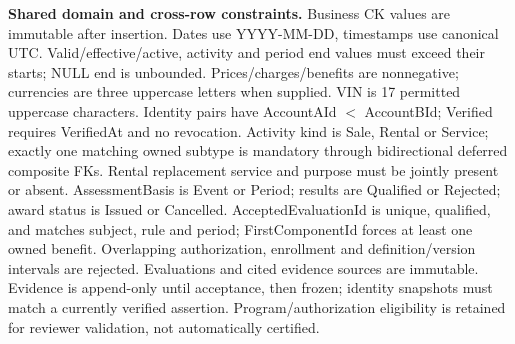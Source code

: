 \par\vspace{4pt}\textbf{Shared domain and cross-row constraints.} Business CK values are immutable after insertion. Dates use YYYY-MM-DD, timestamps use canonical UTC. Valid/effective/active, activity and period end values must exceed their starts; NULL end is unbounded. Prices/charges/benefits are nonnegative; currencies are three uppercase letters when supplied. VIN is 17 permitted uppercase characters. Identity pairs have AccountAId $<$ AccountBId; Verified requires VerifiedAt and no revocation. Activity kind is Sale, Rental or Service; exactly one matching owned subtype is mandatory through bidirectional deferred composite FKs. Rental replacement service and purpose must be jointly present or absent. AssessmentBasis is Event or Period; results are Qualified or Rejected; award status is Issued or Cancelled. AcceptedEvaluationId is unique, qualified, and matches subject, rule and period; FirstComponentId forces at least one owned benefit. Overlapping authorization, enrollment and definition/version intervals are rejected. Evaluations and cited evidence sources are immutable. Evidence is append-only until acceptance, then frozen; identity snapshots must match a currently verified assertion. Program/authorization eligibility is retained for reviewer validation, not automatically certified.
